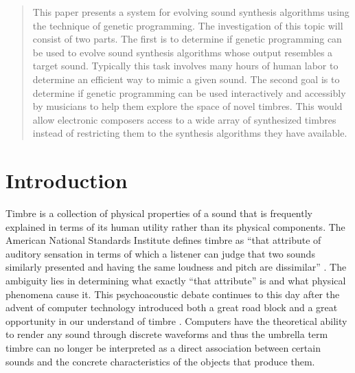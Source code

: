 \documentclass[12pt]{article}
\begin{document}
\maketitle

\begin{abstract}
This paper presents a system for evolving sound synthesis algorithms using the technique of genetic programming. The investigation of this topic will consist of two parts. The first is to determine if genetic programming can be used to evolve sound synthesis algorithms whose output resembles a target sound. Typically this task involves many hours of human labor to determine an efficient way to mimic a given sound. The second goal is to determine if genetic programming can be used interactively and accessibly by musicians to help them explore the space of novel timbres. This would allow electronic composers access to a wide array of synthesized timbres instead of restricting them to the synthesis algorithms they have available.
\end{abstract}

\section{Introduction}
Timbre is a collection of physical properties of a sound that is frequently explained in terms of its human utility rather than its physical components. The American National Standards Institute defines timbre as ``that attribute of auditory sensation in terms of which a listener can judge that two sounds similarly presented and having the same loudness and pitch are dissimilar'' \citep{american1960american}. The ambiguity lies in determining what exactly ``that attribute'' is and what physical phenomena cause it. This psychoacoustic debate continues to this day after the advent of computer technology introduced both a great road block and a great opportunity in our understand of timbre \citep{erickson1975sound}. Computers have the theoretical ability to render any sound through discrete waveforms and thus the umbrella term timbre can no longer be interpreted as a direct association between certain sounds and the concrete characteristics of the objects that produce them.
\end{document}
